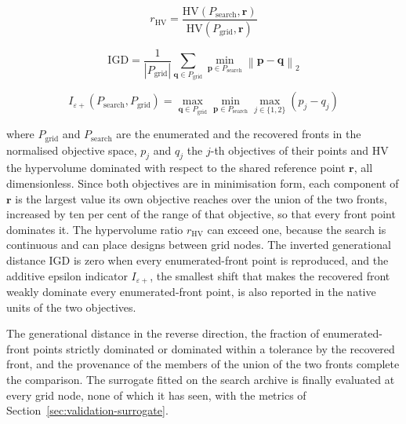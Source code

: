 \begin{equation}
  r_{\mathrm{HV}} = \frac{\mathrm{HV}\!\left(P_{\mathrm{search}}, \mathbf{r}\right)}
                         {\mathrm{HV}\!\left(P_{\mathrm{grid}}, \mathbf{r}\right)}
  \label{eq:val-hvratio}
\end{equation}

\begin{equation}
  \mathrm{IGD} = \frac{1}{\left|P_{\mathrm{grid}}\right|}
                 \sum_{\mathbf{q}\in P_{\mathrm{grid}}}
                 \min_{\mathbf{p}\in P_{\mathrm{search}}}
                 \left\lVert \mathbf{p} - \mathbf{q} \right\rVert_2
  \label{eq:val-igd}
\end{equation}

\begin{equation}
  I_{\varepsilon+}\!\left(P_{\mathrm{search}}, P_{\mathrm{grid}}\right)
  = \max_{\mathbf{q}\in P_{\mathrm{grid}}}
    \min_{\mathbf{p}\in P_{\mathrm{search}}}
    \max_{j\in\{1,2\}} \left(p_j - q_j\right)
  \label{eq:val-eps}
\end{equation}

\noindent where $P_\mathrm{grid}$ and $P_\mathrm{search}$ are the
enumerated and the recovered fronts in the normalised objective space,
$p_j$ and $q_j$ the $j$-th objectives of their points and $\mathrm{HV}$
the hypervolume dominated with respect to the shared reference point
$\mathbf{r}$, all dimensionless. Since both objectives are in
minimisation form, each component of $\mathbf{r}$ is the largest value
its own objective reaches over the union of the two fronts, increased
by ten per cent of the range of that objective, so that every front
point dominates it. The hypervolume ratio $r_\mathrm{HV}$
can exceed one, because the search is continuous and can place designs
between grid nodes. The inverted generational distance IGD is zero when
every enumerated-front point is reproduced, and the additive epsilon
indicator $I_{\varepsilon+}$, the smallest shift that makes the
recovered front weakly dominate every enumerated-front point, is also
reported in the native units of the two objectives.

The generational distance in the reverse direction, the fraction of
enumerated-front points strictly dominated or dominated within a
tolerance by the recovered front, and the provenance of the members of
the union of the two fronts complete the comparison. The surrogate
fitted on the search archive is finally evaluated at every grid node,
none of which it has seen, with the metrics of
Section~\ref{sec:validation-surrogate}.

